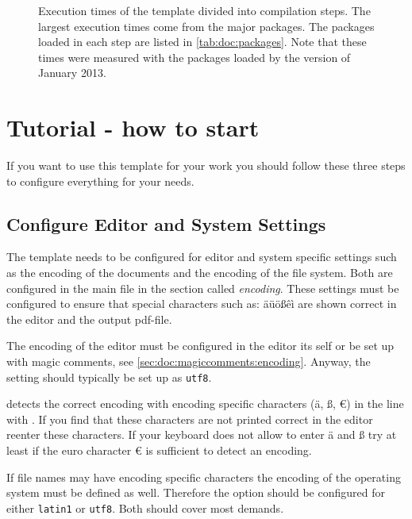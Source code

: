 \begin{figure}[p]

\caption[Execution times of the template divided into compilation steps]{Execution times of the template divided into compilation steps. The largest execution times come from the major packages. The packages loaded in each step are listed in \cref{tab:doc:packages}. Note that these times were measured with the packages loaded by the version of January 2013.}
\label{fig:doc:executiontimes}
\end{figure}



\section{Tutorial - how to start}
\label{sec:doc:start}

If you want to use this template for your work you should follow these three steps to configure everything for your needs.

\subsection{Configure Editor and System Settings}
\label{sec:doc:config:editor}

The template needs to be configured for editor and system specific settings such as the encoding of the documents and the encoding of the file system. Both are configured in the main file in the section called \emph{encoding}.
These settings must be configured to ensure that special characters such as: äüößêì are shown correct in the editor and the output pdf-file.

The encoding of the editor must be configured in the editor its self or be set up with magic comments, see \cref{sec:doc:magiccomments:encoding}. Anyway, the setting should typically be set up as \texttt{utf8}.

\latex detects the correct encoding with encoding specific characters (ä, ß, €) in the line with . If you find that these characters are not printed correct in the editor reenter these characters. If your keyboard does not allow to enter ä and ß try at least if the euro character € is sufficient to detect an encoding. 

If file names may have encoding specific characters the encoding of the operating system must be defined as well. Therefore the option  should be configured for either \texttt{latin1} or \texttt{utf8}. Both should cover most demands.

